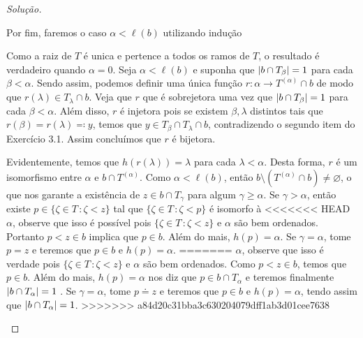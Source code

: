 \documentclass[a4paper]{article}
\begin{document}
\begin{proof}[Solução]
\begin{enumerate}[(i)]
Por fim, faremos o caso \(\alpha<\ell(b)\) utilizando indução%

Como a raiz de \(T\) é unica e pertence a todos os ramos de \(T\), o resultado é
verdadeiro quando \(\alpha = 0\). Seja \(\alpha < \ell(b)\)  e suponha que
\(\vert b \cap T_\beta \vert = 1\) para cada \(\beta < \alpha\).
Sendo assim, podemos definir uma única função \(r\colon\alpha\to
T^{(\alpha)}\cap b\) de modo que \(r(\lambda)\in T_\lambda\cap b\). Veja que \(r\) que é sobrejetora uma vez que \(\vert b\cap
  T_\beta \vert=1\) para cada \(\beta<\alpha\). Além disso, \(r\) é injetora pois se
existem \(\beta,\lambda\) distintos tais que \(r(\beta)=r(\lambda)\eqqcolon y\), temos que
\(y\in T_\beta\cap T_\lambda\cap b\), contradizendo o segundo item do Exercício
3.1. Assim concluímos que \(r\) é bijetora.

Evidentemente,  temos que \(h(r(\lambda))=\lambda\) para cada \(\lambda
<\alpha\). Desta forma, \(r\) é um isomorfismo entre \(\alpha\) e \(b\cap
T^{(\alpha)}\). Como \(\alpha<\ell(b)\), então
\(b\setminus (T^{(\alpha)}\cap b)\neq\varnothing\), o que nos garante a
existência de \(z\in b\cap T_\gamma\) para algum \(\gamma\geq\alpha\). Se
\(\gamma>\alpha\), então existe \(p\in \{\zeta\in T\,\colon\zeta<z\}\) tal que
\(\{\zeta\in T\,\colon\zeta<p\}\) é isomorfo à
<<<<<<< HEAD
\(\alpha\), observe que isso é possível pois \(\{\zeta\in T\,\colon\zeta<z\}\) e
\(\alpha\) são bem ordenados. Portanto \(p<z\in b\) implica que \(p\in b\). Além
do mais, \(h(p)=\alpha\). Se \(\gamma=\alpha\), tome \(p= z\) e teremos que
\(p\in b\) e \(h(p)=\alpha\).
=======
\(\alpha\), observe que isso é verdade pois \(\{\zeta\in T\,\colon\zeta<z\}\) e
\(\alpha\) são bem ordenados. Como \(p<z\in b\), temos que \(p\in b\). Além
do mais, \(h(p)=\alpha\) nos diz que \(p\in b\cap T_\alpha\) e teremos finalmente \(\vert b\cap T_\alpha \vert=1\) . Se \(\gamma=\alpha\), tome \(p\doteq z\) e teremos que
\(p\in b\) e \(h(p)=\alpha\), tendo assim que \(\vert b\cap T_\alpha \vert=1\).
>>>>>>> a84d20c31bba3c630204079dff1ab3d01cee7638



\end{enumerate}
\end{proof}
\end{document}
